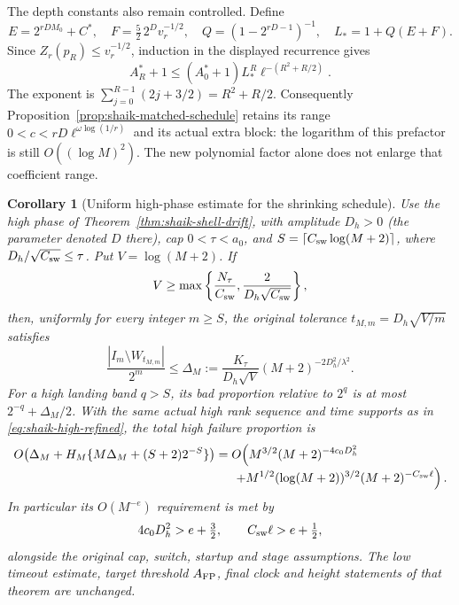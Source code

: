 \documentclass[11pt]{article}
\newtheorem{corollary}[proposition]{Corollary}
\theoremstyle{remark}\newtheorem{remark}[proposition]{Remark}
\begin{document}
The depth constants also remain controlled. Define
\[
 E=2^{rDM_0}+C^*,\quad F=\tfrac52\,2^D v_r^{-1/2},\quad
 Q=(1-2^{rD-1})^{-1},\quad L_*=1+Q(E+F).
\]
Since \(Z_r(p_R)\le v_r^{-1/2}\), induction in the displayed recurrence
gives
\[
 A_R^*+1\le(A_0^*+1)L_*^R\ell^{-(R^2+R/2)}.
\]
The exponent is \(\sum_{j=0}^{R-1}(2j+3/2)=R^2+R/2\).
Consequently Proposition~\ref{prop:shaik-matched-schedule} retains
its range \(0<c<rD\ell^{\omega\log(1/r)}\) and its actual extra block:
the logarithm of this prefactor is still \(O((\log M)^2)\).
The new polynomial factor alone does not enlarge that coefficient range.

\begin{corollary}[Uniform high-phase estimate for the shrinking schedule]
\label{cor:shaik-shrinking-prefactor}
Use the high phase of Theorem~\ref{thm:shaik-shell-drift}, with
amplitude \(D_h>0\) (the parameter denoted \(D\) there),
cap \(0<\tau<a_0\), and
\(S=\lceil C_{\rm sw}\log(M+2)\rceil\), where
\(D_h/\sqrt{C_{\rm sw}}\le\tau\).
Put \(V=\log(M+2)\). If
\[
 V\ge\max\left\{\frac{N_\tau}{C_{\rm sw}},
                      \frac{2}{D_h\sqrt{C_{\rm sw}}}\right\},
\]
then, uniformly for every integer \(m\ge S\), the original tolerance
\(t_{M,m}=D_h\sqrt{V/m}\) satisfies
\begin{equation}\label{eq:shaik-shrinking-prefactor}
 \frac{|I_m\setminus W_{t_{M,m}}|}{2^m}
 \le \Delta_M:=
 \frac{K_\tau}{D_h\sqrt V}(M+2)^{-2D_h^2/\lambda^2}.
\end{equation}
For a high landing band \(q>S\), its bad proportion relative to
\(2^q\) is at most \(2^{-q}+\Delta_M/2\).
With the same actual high rank sequence and time supports as in
\eqref{eq:shaik-high-refined}, the total high failure proportion is
\begin{align}
 O\!\left(\Delta_M+
 H_M\{M\Delta_M+(S+2)2^{-S}\}\right)
 &=O\!\left(
 M^{3/2}(M+2)^{-4c_0D_h^2}
 \right.\nonumber\\[-1mm]
 &\hspace{5mm}\left.+
 M^{1/2}(\log(M+2))^{3/2}
                   (M+2)^{-C_{\rm sw}\ell}\right).
 \label{eq:shaik-shrinking-high-charge}
\end{align}
In particular its \(O(M^{-e})\) requirement is met by
\[
 4c_0D_h^2>e+\tfrac32,\qquad C_{\rm sw}\ell>e+\tfrac12,
\]
alongside the original cap, switch, startup and stage assumptions.
The low timeout estimate, target threshold \(A_{\rm FP}\), final
clock and height statements of that theorem are unchanged.
\end{corollary}
\end{document}
